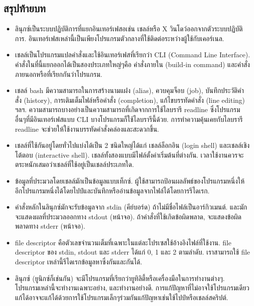 \begin{thwbr}
\section{สรุปท้ายบท}
\begin{itemize}
\item ลินุกซ์เป็นระบบปฏิบัติการที่แยกอินเทอร์เฟสอเช่น เชลล์หรือ X วินโดว์ออกจากตัวระบบปฏิบัติการ. อินเทอร์เฟสเหล่านี้เป็นเพียงโปรแกรมตัวกลางที่ใช้ติดต่อระหว่างผู้ใช้กับเคอร์เนล.
\item เชลล์เป็นโปรแกรมแปลคำสั่งและใช้อินเทอร์เฟสที่เรียกว่า CLI (Command Line Interface). คำสั่งในที่นี้แยกออกได้เป็นสองประเภทใหญ่ๆคือ คำสั่งภายใน (build-in command) และคำสั่งภายนอกหรือที่เรียกกันว่าโปรแกรม.
\item เชลล์ bash มีความสามารถในการสร้างนามแฝง (alias), ควบคุมจ็อบ (job), บันทึกประวัติคำสั่ง (history), การเติมเต็มไฟล์หรือคำสั่ง (completion), แก้ไขบรรทัดคำสั่ง (line editing) ฯลฯ. ความสามารถบางอย่างเป็นความสามารถที่เกิดจากการใช้ไลบรารี readline ซึ่งโปรแกรมอื่นๆที่มีอินเทอร์เฟสแบบ CLI บางโปรแกรมก็ใช้ไลบรารีนี้ด้วย. การทำความคุ้นเคยกับไลบรารี readline จะช่วยให้ใช้งานบรรทัดคำสั่งคล่องและสะดวกขึ้น.
\item เชลล์ที่ใช้กันอยู่โดยทั่วไปแบ่งได้เป็น 2 ชนิดใหญ่ได้แก่ เชลล์ล็อกอิน (login shell) และเชลล์เชิงโต้ตอบ (interactive shell). เชลล์ทั้งสองแบบมีไฟล์ตั้งค่าเริ่มต้นที่ต่างกัน. เวลาใช้งานควรจะตระหนักเสมอว่าเชลล์ที่ใช้อยู่เป็นเชลล์ประเภทใด.
\item ข้อมูลที่ประมวลโดยเชลล์มักเป็นข้อมูลแบบเท็กซ์. ผู้ใช้สามารถป้อนผลลัพธ์ของโปรแกรมหนึ่งให้อีกโปรแกรมหนึ่งได้โดยไปป์และบันทึกหรืออ่านข้อมูลจากไฟล์ได้โดยการรีไดเรก.
\item คำสั่งหลักในลินุกซ์มักจะรับข้อมูลจาก stdin (คีย์บอร์ด) ถ้าไม่มีชื่อไฟล์เป็นอาร์กิวเมนต์. และมักจะแสดงผลที่ประมวลออกทาง stdout (หน้าจอ). ถ้าคำสั่งที่ใช้เกิดข้อผิดพลาด, จะแสดงข้อผิดพลาดทาง stderr (หน้าจอ).
\item file descriptor คือตัวเลขจำนวนเต็มที่เฉพาะในแต่ละโปรเซสใช้อ้างอิงไฟล์ที่ใช้งาน. file descriptor ของ stdin, stdout และ stderr ได้แก่ 0, 1 และ 2 ตามลำดับ. เราสามารถใช้ file descriptor เหล่านี้รีไดเรกข้อมูลหาซึ่งกันและกันได้.
\item ลินุกซ์ (ยูนิกซ์ก็เช่นกัน) จะมีโปรแกรมที่เรียกว่ายูทิลิตี้หรือเครื่องมือในการทำงานต่างๆ. โปรแกรมเหล่านี้จะทำงานเฉพาะอย่าง, และทำงานอย่างดี. การแก้ปัญหาที่ไม่อาจใช้โปรแกรมเดียวแก้ได้อาจจะแก้ได้ด้วยการใช้โปรแกรมเล็กๆร่วมกันแก้ปัญหาเช่นใช้ไปป์หรือเชลล์สคริปต์.
\end{itemize}


\end{thwbr}
